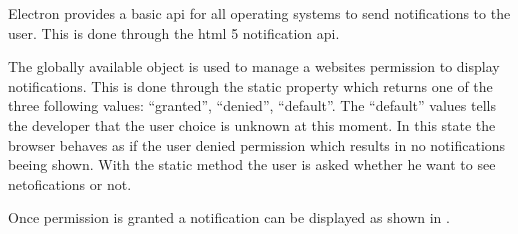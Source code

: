 

Electron provides a basic \gls{api} for all operating systems to send notifications to the user. This is done through the \gls{html} 5 notification \gls{api}.


The globally available  object is used to manage a websites permission to display notifications. This is done through the static  property which returns one of the three following values: \enquote{granted}, \enquote{denied}, \enquote{default}. The \enquote{default} values tells the developer that the user choice is unknown at this moment. In this state the browser behaves as if the user denied permission which results in no notifications beeing shown. With the static  method the user is asked whether he want to see netofications or not.


Once permission is granted a notification can be displayed as shown in .




